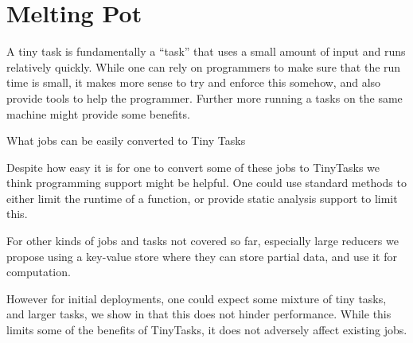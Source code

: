 \section{Melting Pot}
\begin{myitemize}
\item A tiny task is fundamentally a ``task'' that uses a small amount of input and runs relatively quickly. While one
can rely on programmers to make sure that the run time is small, it makes more sense to try and enforce this somehow,
and also provide tools to help the programmer. Further more running a tasks on the same machine might provide some
benefits.
\item What jobs can be easily converted to Tiny Tasks 
\item Despite how easy it is for one to convert some of these jobs to TinyTasks we think programming support might be
helpful. One could use standard methods to either limit the runtime of a function, or provide static analysis support to
limit this.
\item For other kinds of jobs and tasks not covered so far, especially large reducers we propose using a key-value store
where they can store partial data, and use it for computation.
\item However for initial deployments, one could expect some mixture of tiny tasks, and larger tasks, we show in
 that this does not hinder performance. While this limits some of the benefits of TinyTasks, it does
not adversely affect existing jobs.
\end{myitemize}
